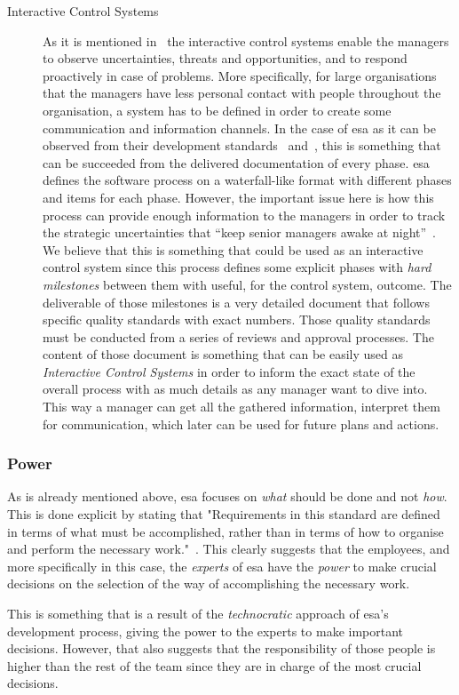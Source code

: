\begin{description}
\item[Interactive Control Systems]
As it is mentioned in~\citep{simons1995control} the interactive control systems enable the managers to observe uncertainties, threats and opportunities, and to respond proactively in case of problems. More specifically, for large organisations that the managers have less personal contact with people throughout the organisation, a system has to be defined in order to create some communication and information channels. In the case of \ac{esa} as it can be observed from their development standards~\citep{jones1997esa} and~\citep{secretariat1996space}, this is something that can be succeeded from the delivered documentation of every phase. \ac{esa} defines the software process on a waterfall-like format with different phases and items for each phase. However, the important issue here is how this process can provide enough information to the managers in order to track the strategic uncertainties that ``keep senior managers awake at night''~\citep{simons1995control}. We believe that this is something that could be used as an interactive control system since this process defines some explicit phases with \textit{hard milestones} between them with useful, for the control system, outcome. The deliverable of those milestones is a very detailed document that follows specific quality standards with exact numbers. Those quality standards must be conducted from a series of reviews and approval processes. The content of those document is something that can be easily used as \textit{Interactive Control Systems} in order to inform the exact state of the overall process with as much details as any manager want to dive into. This way a manager can get all the gathered information, interpret them for communication, which later can be used for future plans and actions.

\end{description}

\subsubsection{Power}
As is already mentioned above, \ac{esa} focuses on \textit{what} should be done and not \textit{how}. This is done explicit by stating that "Requirements in this standard are defined in terms of what must be accomplished, rather than in terms of how to organise and perform the necessary work."~\citep[3]{ecsQ80a}. This clearly suggests that the employees, and more specifically in this case, the \textit{experts} of \ac{esa} have the \textit{power} to make crucial decisions on the selection of the way of accomplishing the necessary work. 

This is something that is a result of the \textit{technocratic} approach of \ac{esa}'s development process, giving the power to the experts to make important decisions. However, that also suggests that the responsibility of those people is higher than the rest of the team since they are in charge of the most crucial decisions.

